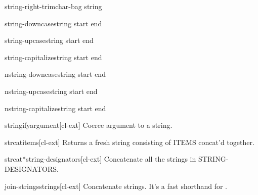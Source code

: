 \documentclass[10pt,english]{book}
\begin{document}
\begin{function}{string-right-trim}{char-bag string}
  
\end{function}

\begin{function}{string-downcase}{string \key start end}
  
\end{function}

\begin{function}{string-upcase}{string \key start end}
  
\end{function}

\begin{function}{string-capitalize}{string \key start end}
  
\end{function}

\begin{function}{nstring-downcase}{string \key start end}
  
\end{function}

\begin{function}{nstring-upcase}{string \key start end}
  
\end{function}

\begin{function}{nstring-capitalize}{string \key start end}
  
\end{function}

\begin{function}{stringify}{argument}[cl-ext]
  Coerce argument to a string.
\end{function}

\begin{function}{strcat}{\rest items}[cl-ext]
  Returns a fresh string consisting of ITEMS concat'd together.
\end{function}

\begin{function}{strcat*}{string-designators}[cl-ext]
  Concatenate all the strings in STRING-DESIGNATORS.
\end{function}

\begin{function}{join-strings}{strings}[cl-ext]
  Concatenate strings. It's a fast shorthand for .
\end{function}
\end{document}
